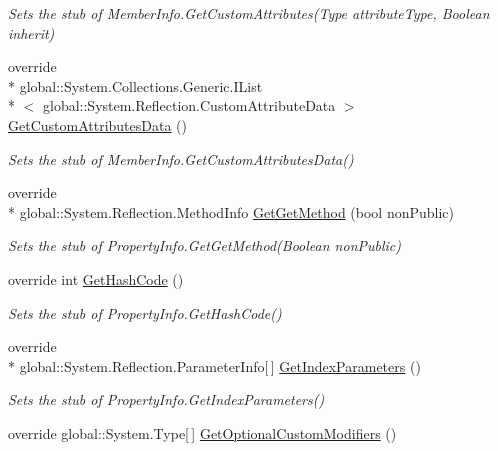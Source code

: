 \begin{DoxyCompactItemize}
\begin{DoxyCompactList}\small\item\em Sets the stub of Member\-Info.\-Get\-Custom\-Attributes(\-Type attribute\-Type, Boolean inherit)\end{DoxyCompactList}\item 
override \\*
global\-::\-System.\-Collections.\-Generic.\-I\-List\\*
$<$ global\-::\-System.\-Reflection.\-Custom\-Attribute\-Data $>$ \hyperlink{class_system_1_1_reflection_1_1_fakes_1_1_stub_property_info_ac32774ad59dd0ed102b1ee92a819798c}{Get\-Custom\-Attributes\-Data} ()
\begin{DoxyCompactList}\small\item\em Sets the stub of Member\-Info.\-Get\-Custom\-Attributes\-Data()\end{DoxyCompactList}\item 
override \\*
global\-::\-System.\-Reflection.\-Method\-Info \hyperlink{class_system_1_1_reflection_1_1_fakes_1_1_stub_property_info_a8e9607ffa0824de25ae021daf3132f9b}{Get\-Get\-Method} (bool non\-Public)
\begin{DoxyCompactList}\small\item\em Sets the stub of Property\-Info.\-Get\-Get\-Method(\-Boolean non\-Public)\end{DoxyCompactList}\item 
override int \hyperlink{class_system_1_1_reflection_1_1_fakes_1_1_stub_property_info_a91669f39485af4adf050e0b43c501654}{Get\-Hash\-Code} ()
\begin{DoxyCompactList}\small\item\em Sets the stub of Property\-Info.\-Get\-Hash\-Code()\end{DoxyCompactList}\item 
override \\*
global\-::\-System.\-Reflection.\-Parameter\-Info\mbox{[}$\,$\mbox{]} \hyperlink{class_system_1_1_reflection_1_1_fakes_1_1_stub_property_info_a82e7d9c2565dedf58c2c044430c0edbe}{Get\-Index\-Parameters} ()
\begin{DoxyCompactList}\small\item\em Sets the stub of Property\-Info.\-Get\-Index\-Parameters()\end{DoxyCompactList}\item 
override global\-::\-System.\-Type\mbox{[}$\,$\mbox{]} \hyperlink{class_system_1_1_reflection_1_1_fakes_1_1_stub_property_info_a3dbb800bd127bd188fbbaca7ac1f8a10}{Get\-Optional\-Custom\-Modifiers} ()

\end{DoxyCompactItemize}
